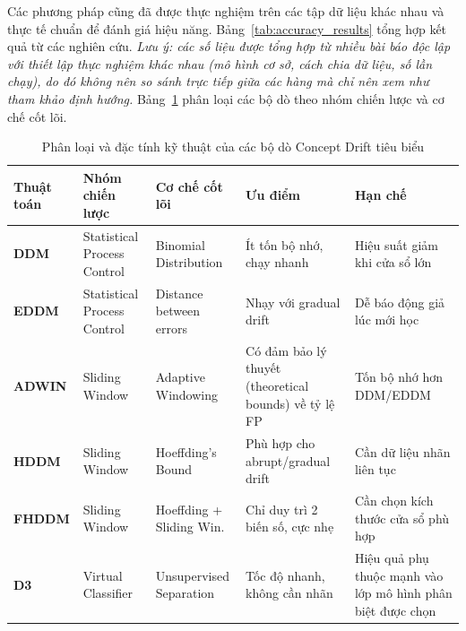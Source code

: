Các phương pháp cũng đã được thực nghiệm trên các tập dữ liệu khác nhau và thực tế chuẩn để đánh giá hiệu năng. Bảng~\ref{tab:accuracy_results} tổng hợp kết quả từ các nghiên cứu. \textit{Lưu ý: các số liệu được tổng hợp từ nhiều bài báo độc lập với thiết lập thực nghiệm khác nhau (mô hình cơ sở, cách chia dữ liệu, số lần chạy), do đó không nên so sánh trực tiếp giữa các hàng mà chỉ nên xem như tham khảo định hướng.} Bảng~\ref{tab:algorithm_taxonomy} phân loại các bộ dò theo nhóm chiến lược và cơ chế cốt lõi.

\begin{table}[H]
	\centering
	\caption{Phân loại và đặc tính kỹ thuật của các bộ dò Concept Drift tiêu biểu}
	\label{tab:algorithm_taxonomy}
	\footnotesize
	\begin{tabular}{@{}lp{2.8cm}p{2.5cm}p{3cm}p{3cm}@{}}
		\toprule
		\textbf{Thuật toán} & \textbf{Nhóm chiến lược}    & \textbf{Cơ chế cốt lõi}  & \textbf{Ưu điểm}                                              & \textbf{Hạn chế}                                                         \\
		\midrule
		\textbf{DDM}        & Statistical Process Control & Binomial Distribution    & Ít tốn bộ nhớ, chạy nhanh~\cite{gama2004learning}             & Hiệu suất giảm khi cửa sổ lớn~\cite{hinder2024survey_partA}              \\
		\addlinespace
		\textbf{EDDM}       & Statistical Process Control & Distance between errors  & Nhạy với gradual drift~\cite{baena2006early}                  & Dễ báo động giả lúc mới học~\cite{hovakimyan2024evolving}                    \\
		\addlinespace
		\textbf{ADWIN}      & Sliding Window              & Adaptive Windowing       & Có đảm bảo lý thuyết (theoretical bounds) về tỷ lệ FP~\cite{bifet2007learning}      & Tốn bộ nhớ hơn DDM/EDDM~\cite{hinder2024survey_partA}                    \\
		\addlinespace
		\textbf{HDDM}       & Sliding Window              & Hoeffding's Bound        & Phù hợp cho abrupt/gradual drift~\cite{friasblanco2015hddm}   & Cần dữ liệu nhãn liên tục~\cite{hovakimyan2024evolving}                      \\
		\addlinespace
		\textbf{FHDDM}      & Sliding Window              & Hoeffding + Sliding Win. & Chỉ duy trì 2 biến số, cực nhẹ~\cite{pesaranghader2016fhddm}  & Cần chọn kích thước cửa sổ phù hợp~\cite{hinder2024survey_partA}         \\
		\addlinespace
		\textbf{D3}         & Virtual Classifier          & Unsupervised Separation  & Tốc độ nhanh, không cần nhãn~\cite{gozuacik2019d3}            & Hiệu quả phụ thuộc mạnh vào lớp mô hình phân biệt được chọn~\cite{hinder2024survey_partA} \\

\end{tabular}
\end{table}
